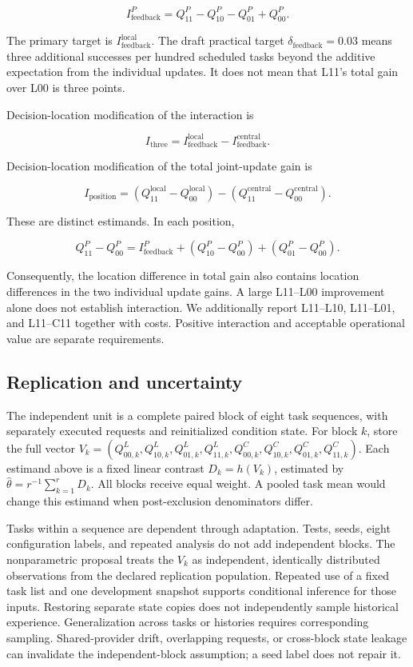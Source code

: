 \documentclass[
  english,
  11pt,
]{article}
\begin{document}
\[
I_{\mathrm{feedback}}^{P}=Q_{11}^{P}-Q_{10}^{P}-Q_{01}^{P}+Q_{00}^{P}.
\]

The primary target is \(I_{\mathrm{feedback}}^{\mathrm{local}}\). The
draft practical target \(\delta_{\mathrm{feedback}}=0.03\) means three
additional successes per hundred scheduled tasks beyond the additive
expectation from the individual updates. It does not mean that L11's
total gain over L00 is three points.

Decision-location modification of the interaction is

\[
I_{\mathrm{three}}=I_{\mathrm{feedback}}^{\mathrm{local}}
-I_{\mathrm{feedback}}^{\mathrm{central}}.
\]

Decision-location modification of the total joint-update gain is

\[
I_{\mathrm{position}}=(Q_{11}^{\mathrm{local}}-Q_{00}^{\mathrm{local}})
-(Q_{11}^{\mathrm{central}}-Q_{00}^{\mathrm{central}}).
\]

These are distinct estimands. In each position,

\[
Q_{11}^{P}-Q_{00}^{P}=I_{\mathrm{feedback}}^{P}
+(Q_{10}^{P}-Q_{00}^{P})+(Q_{01}^{P}-Q_{00}^{P}).
\]

Consequently, the location difference in total gain also contains
location differences in the two individual update gains. A large
L11--L00 improvement alone does not establish interaction. We
additionally report L11--L10, L11--L01, and L11--C11 together with
costs. Positive interaction and acceptable operational value are
separate requirements.

\subsection{Replication and
uncertainty}\label{replication-and-uncertainty}

The independent unit is a complete paired block of eight task sequences,
with separately executed requests and reinitialized condition state. For
block \(k\), store the full vector
\(V_k=(Q^{L}_{00,k},Q^{L}_{10,k},Q^{L}_{01,k},Q^{L}_{11,k},Q^{C}_{00,k},Q^{C}_{10,k},Q^{C}_{01,k},Q^{C}_{11,k})\).
Each estimand above is a fixed linear contrast \(D_k=h(V_k)\), estimated
by \(\hat\theta=r^{-1}\sum_{k=1}^{r}D_k\). All blocks receive equal
weight. A pooled task mean would change this estimand when
post-exclusion denominators differ.

Tasks within a sequence are dependent through adaptation. Tests, seeds,
eight configuration labels, and repeated analysis do not add independent
blocks. The nonparametric proposal treats the \(V_k\) as independent,
identically distributed observations from the declared replication
population. Repeated use of a fixed task list and one development
snapshot supports conditional inference for those inputs. Restoring
separate state copies does not independently sample historical
experience. Generalization across tasks or histories requires
corresponding sampling. Shared-provider drift, overlapping requests, or
cross-block state leakage can invalidate the independent-block
assumption; a seed label does not repair it.
\end{document}
